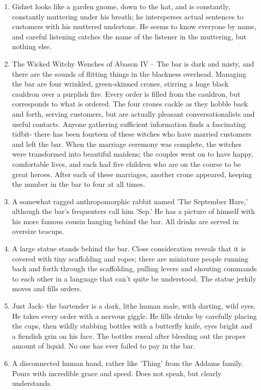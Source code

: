 \documentclass{article}
\begin{document}
\begin{enumerate}
	\item Gidzet looks like a garden gnome, down to the hat, and is constantly, constantly muttering under his breath; he intersperses actual sentences to customers with his muttered undertone. He seems to know everyone by name, and careful listening catches the name of the listener in the muttering, but nothing else.
	\item The Wicked Witchy Wenches of Abason IV – The bar is dark and misty, and there are the sounds of flitting things in the blackness overhead. Managing the bar are four wrinkled, green-skinned crones, stirring a huge black cauldron over a purplish fire. Every order is filled from the cauldron, but corresponds to what is ordered. The four crones cackle as they hobble back and forth, serving customers, but are actually pleasant conversationalists and useful contacts. Anyone gathering sufficient information finds a fascinating tidbit- there has been fourteen of these witches who have married customers and left the bar. When the marriage ceremony was complete, the witches were transformed into beautiful maidens; the couples went on to have happy, comfortable lives, and each had five children who are on the course to be great heroes. After each of these marriages, another crone appeared, keeping the number in the bar to four at all times.
	\item A somewhat ragged anthropomorphic rabbit named 'The September Hare,' although the bar's frequenters call him 'Sep.' He has a picture of himself with his more famous cousin hanging behind the bar. All drinks are served in oversize teacups.
	\item A large statue stands behind the bar. Close consideration reveals that it is covered with tiny scaffolding and ropes; there are miniature people running back and forth through the scaffolding, pulling levers and shouting commands to each other in a language that can't quite be understood. The statue jerkily moves and fills orders.
	\item Just Jack- the bartender is a dark, lithe human male, with darting, wild eyes. He takes every order with a nervous giggle. He fills drinks by carefully placing the cups, then wildly stabbing bottles with a butterfly knife, eyes bright and a fiendish grin on his face. The bottles reseal after bleeding out the proper amount of liquid. No one has ever failed to pay in the bar.
	\item A disconnected human hand, rather like 'Thing' from the Addams family. Pours with incredible grace and speed. Does not speak, but clearly understands.

\end{enumerate}
\end{document}
